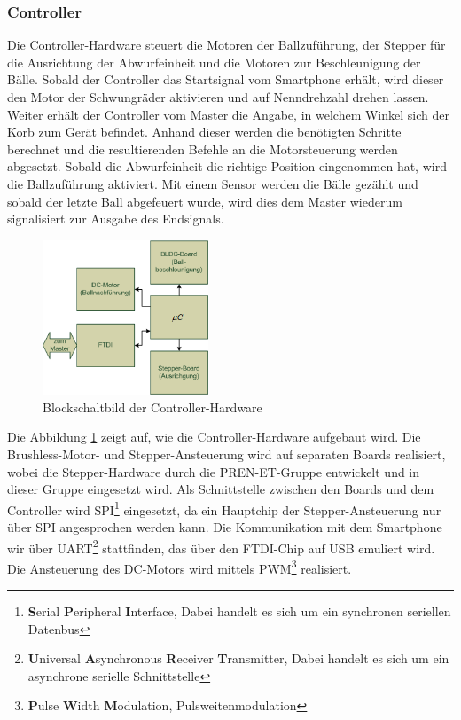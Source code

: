 \subsubsection{Controller}
\label{sec:Controller}
	Die Controller-Hardware steuert die Motoren der Ballzuführung, der Stepper für die Ausrichtung 
	der Abwurfeinheit und die Motoren zur Beschleunigung der Bälle. Sobald der Controller das Startsignal vom Smartphone erhält, 
	wird dieser den Motor der Schwungräder aktivieren und auf Nenndrehzahl drehen lassen. Weiter erhält der Controller vom Master die Angabe, 
	in welchem Winkel sich der Korb zum Gerät befindet. Anhand dieser werden die benötigten Schritte berechnet und die resultierenden Befehle 
	an die Motorsteuerung werden abgesetzt. Sobald die Abwurfeinheit die richtige Position eingenommen hat, wird die Ballzuführung aktiviert. 
	Mit einem Sensor werden die Bälle gezählt und sobald der letzte Ball abgefeuert wurde, wird dies dem Master wiederum signalisiert zur Ausgabe des Endsignals.\\
	\begin{figure}
		\centering
		\includegraphics[width=0.44\textwidth]{Enddokumentation/Loesungskonzept/Bilder/Blockschaltbild_Controller.png}
		\caption{Blockschaltbild der Controller-Hardware}
		\label{fig:Blockschaltbild_Controller}
	\end{figure}
	Die Abbildung \ref{fig:Blockschaltbild_Controller} zeigt auf, wie die Controller-Hardware aufgebaut wird. 
	Die Brushless-Motor- und Stepper-Ansteuerung wird auf separaten Boards realisiert, wobei die Stepper-Hardware durch die PREN-ET-Gruppe
	entwickelt und in dieser Gruppe eingesetzt wird. Als Schnittstelle zwischen den Boards und dem Controller wird SPI\footnote{\textbf{S}erial \textbf{P}eripheral \textbf{I}nterface, Dabei handelt es sich um ein synchronen seriellen Datenbus} eingesetzt, 
	da ein Hauptchip der Stepper-Ansteuerung nur über SPI angesprochen werden kann. Die Kommunikation mit dem Smartphone wir über UART\footnote{\textbf{U}niversal \textbf{A}synchronous \textbf{R}eceiver \textbf{T}ransmitter, Dabei handelt es sich um ein asynchrone serielle Schnittstelle} stattfinden, 
	das über den FTDI-Chip auf USB emuliert wird. Die Ansteuerung des DC-Motors wird mittels PWM\footnote{\textbf{P}ulse \textbf{W}idth \textbf{M}odulation, Pulsweitenmodulation} realisiert.